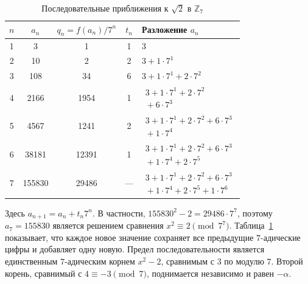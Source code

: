 \documentclass{misisarticle}
\begin{document}
\begin{table}[htbp]
  \caption{Последовательные приближения к $\sqrt{2}$ в $\mathbb Z_7$}
  \label{tab:hensel-example}
  \centering
  \setlength{\tabcolsep}{1.5pt}
  \begin{tabular}{c c c c >{\raggedright\arraybackslash}p{4.2cm}}
    \toprule
    $n$ & $a_n$ & $q_n=f(a_n)/7^n$ & $t_n$ & Разложение $a_n$ \\
    \toprule
    1 & 3 & 1 & 1 & $3$ \\
    2 & 10 & 2 & 2 & $3+1\cdot7^1$ \\
    3 & 108 & 34 & 6 & $3+1\cdot7^1+2\cdot7^2$ \\
    4 & 2166 & 1954 & 1 & $\begin{gathered}3+1\cdot7^1+2\cdot7^2\\{}+6\cdot7^3\end{gathered}$ \\
    5 & 4567 & 1241 & 2 & $\begin{gathered}3+1\cdot7^1+2\cdot7^2+6\cdot7^3\\{}+1\cdot7^4\end{gathered}$ \\
    6 & 38181 & 12391 & 1 & $\begin{gathered}3+1\cdot7^1+2\cdot7^2+6\cdot7^3\\{}+1\cdot7^4+2\cdot7^5\end{gathered}$ \\
    7 & 155830 & 29486 & --- & $\begin{gathered}3+1\cdot7^1+2\cdot7^2+6\cdot7^3\\{}+1\cdot7^4+2\cdot7^5+1\cdot7^6\end{gathered}$ \\
    \bottomrule
  \end{tabular}
\end{table}

Здесь $a_{n+1}=a_n+t_n7^n$. В частности, $155830^2-2=29486\cdot7^7$, поэтому $a_7=155830$ является решением сравнения $x^2\equiv2\pmod {7^7}$. Таблица~\ref{tab:hensel-example} показывает, что каждое новое значение сохраняет все предыдущие $7$-адические цифры и добавляет одну новую. Предел последовательности является единственным $7$-адическим корнем $x^2-2$, сравнимым с $3$ по модулю $7$. Второй корень, сравнимый с $4\equiv-3\pmod7$, поднимается независимо и равен $-\alpha$.
\end{document}
